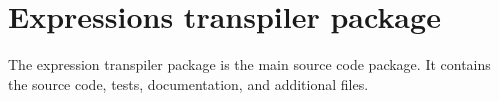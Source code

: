 \section{Expressions transpiler package}
\label{app:transpiler}

The expression transpiler package is the main source code package. It contains the source code, tests, documentation, and additional files.

